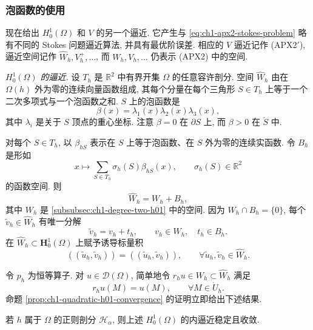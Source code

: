 \subsubsection{泡函数的使用}
\label{subsubsec:ch1-bubble-functions}

现在给出 $H_0^1(\Omega)$ 和 $V$ 的另一个逼近. 它产生与 \eqref{eq:ch1-apx2-stokes-problem} 略有不同的 Stokes 问题逼近算法, 并具有最优阶误差. 相应的 $V$ 逼近记作 (APX2$'$), 逼近空间记作 $\widehat W_h,V_h^+,\ldots$, 而 $W_h,V_h,\ldots$ 仍表示 (APX2) 中的空间.

\emph{$H_0^1(\Omega)$ 的逼近.} 设 $T_h$ 是 $\mathbb R^2$ 中有界开集 $\Omega$ 的任意容许剖分. 空间 $\widehat W_h$ 由在 $\Omega(h)$ 外为零的连续向量函数组成, 其每个分量在每个三角形 $S\in T_h$ 上等于一个二次多项式与一个泡函数之和. $S$ 上的泡函数是
\[
\beta(x)=\lambda_1(x)\lambda_2(x)\lambda_3(x),
\]
其中 $\lambda_i$ 是关于 $S$ 顶点的重心坐标. 注意 $\beta=0$ 在 $\partial S$ 上, 而 $\beta>0$ 在 $\mathring S$ 中.

对每个 $S\in T_h$, 以 $\beta_{hS}$ 表示在 $S$ 上等于泡函数、在 $S$ 外为零的连续实函数. 令 $B_h$ 是形如
\begin{equation}
x\longmapsto\sum_{S\in T_h}\sigma_h(S)\beta_{hS}(x),
\qquad\sigma_h(S)\in\mathbb R^2
\label{eq:ch1-bubble-space}
\end{equation}
的函数空间. 则
\begin{equation}
\widehat W_h=W_h+B_h,
\label{eq:ch1-enriched-space-sum}
\end{equation}
其中 $W_h$ 是 \ref{subsubsec:ch1-degree-two-h01} 中的空间. 因为 $W_h\cap B_h=\{0\}$, 每个 $\widetilde v_h\in\widehat W_h$ 有唯一分解
\begin{equation}
\widetilde v_h=v_h+t_h,\qquad
v_h\in W_h,\quad t_h\in B_h.
\label{eq:ch1-enriched-space-decomposition}
\end{equation}
在 $\widehat W_h\subset\mathbf H_0^1(\Omega)$ 上赋予诱导标量积
\begin{equation}
((\widetilde u_h,\widetilde v_h))
=((\widetilde u_h,\widetilde v_h)),
\qquad\forall\widetilde u_h,\widetilde v_h\in\widehat W_h.
\label{eq:ch1-enriched-h01-product}
\end{equation}

令 $p_h$ 为恒等算子. 对 $u\in\mathcal D(\Omega)$, 简单地令 $r_hu\in W_h\subset\widehat W_h$ 满足
\[
r_hu(M)=u(M),\qquad\forall M\in\mathring U_h.
\]
命题 \ref{prop:ch1-quadratic-h01-convergence} 的证明立即给出下述结果.

\begin{Proposition}
\label{prop:ch1-enriched-h01-convergence}
若 $h$ 属于 $\Omega$ 的正则剖分 $\mathcal H_\alpha$, 则上述 $H_0^1(\Omega)$ 的内逼近稳定且收敛.
\end{Proposition}

